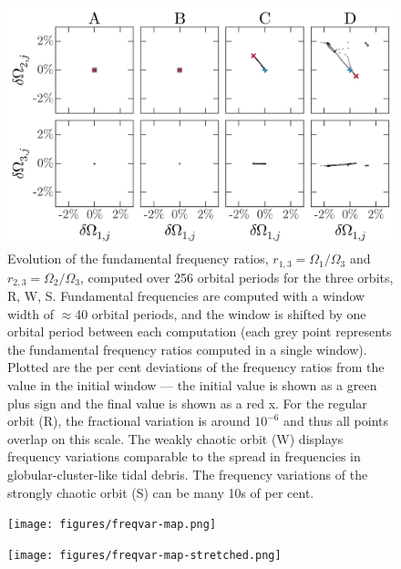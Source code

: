 \documentclass[letterpaper,12pt,preprint]{aastex}
\begin{document}
\clearpage
\begin{figure}[p]
\begin{center}
\includegraphics[width=\textwidth]{figures/freq-evolution.png}
\caption{Evolution of the fundamental frequency ratios, $r_{1,3} = \Omega_1 / \Omega_3$ and $r_{2,3} = \Omega_2 / \Omega_3$, computed over 256 orbital periods for the three orbits, R, W, S. Fundamental frequencies are computed with a window width of $\approx$40 orbital periods, and the window is shifted by one orbital period between each computation (each grey point represents the fundamental frequency ratios computed in a single window). Plotted are the per cent deviations of the frequency ratios from the value in the initial window --- the initial value is shown as a green plus sign and the final value is shown as a red x. For the regular orbit (R), the fractional variation is around $10^{-6}$ and thus all points overlap on this scale. The weakly chaotic orbit (W) displays frequency variations comparable to the spread in frequencies in globular-cluster-like tidal debris. The frequency variations of the strongly chaotic orbit (S) can be many 10s of per cent.} 
\label{fig:three-orbits-freqs}
\end{center}
\end{figure}

\clearpage
\begin{figure}[p]
\begin{center}
\texttt{[image: figures/freqvar-map.png]}
\caption{ } 
\label{fig:freqvar_map}
\end{center}
\end{figure}

\clearpage
\begin{figure}[p]
\begin{center}
\texttt{[image: figures/freqvar-map-stretched.png]}
\caption{ } 
\label{fig:freqvar_map_stretched}
\end{center}
\end{figure}
\end{document}

